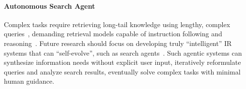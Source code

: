 \paragraph{Autonomous Search Agent}
Complex tasks require retrieving long-tail knowledge using lengthy, complex queries~\cite{soudani2024finetuning,su2024bright}, demanding retrieval models capable of instruction following and reasoning~\cite{weller2024followir,ravfogel2024descriptionbased}. 
Future research should focus on developing truly ``intelligent'' IR systems that can ``self-evolve'', such as search agents~\cite{nakano2021webgpt,he2025pasa}. Such agentic systems can synthesize information needs without explicit user input, iteratively reformulate queries and analyze search results, eventually solve complex tasks with minimal human guidance.